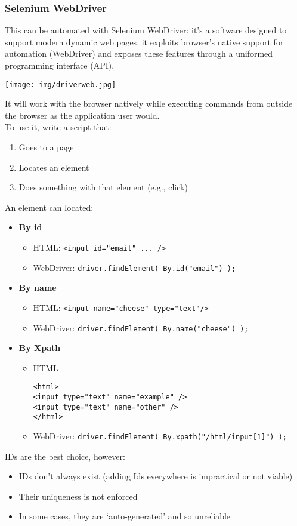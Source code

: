 \documentclass[a4paper, 10pt, titlepage]{article}
\begin{document}
\subsubsection*{Selenium WebDriver}
This can be automated with Selenium WebDriver: it's a software designed to support modern dynamic web pages, it exploits browser’s native support for automation (WebDriver) and exposes these features through a uniformed programming interface (API).
\begin{center}
\texttt{[image: img/driverweb.jpg]}
\end{center}
It will work with the browser natively while executing commands from outside the browser as the application user would. \\
To use it, write a script that:
\begin{enumerate}
\item Goes to a page
\item Locates an element
\item Does something with that element (e.g., click)
\end{enumerate}
An element can located:
\begin{itemize}
\item \textbf{By id}
	\begin{itemize}
	\item HTML: \lstinline|<input id="email" ... />|
	\item WebDriver: \lstinline|driver.findElement( By.id("email") );|
	\end{itemize}
\item \textbf{By name}
	\begin{itemize}
	\item HTML: \lstinline|<input name="cheese" type="text"/>|
	\item WebDriver: \lstinline|driver.findElement( By.name("cheese") );|
	\end{itemize}
\item \textbf{By Xpath}
	\begin{itemize}
	\item HTML
	\begin{lstlisting}
<html>
<input type="text" name="example" />
<input type="text" name="other" />
</html>
	\end{lstlisting}
	\item WebDriver: \lstinline|driver.findElement( By.xpath("/html/input[1]") );|
	\end{itemize}
\end{itemize}
IDs are the best choice, however:
\begin{itemize}
\item IDs don’t always exist (adding Ids everywhere is impractical or not viable)
\item Their uniqueness is not enforced
\item In some cases, they are ‘auto-generated’ and so unreliable
\end{itemize}
\end{document}
